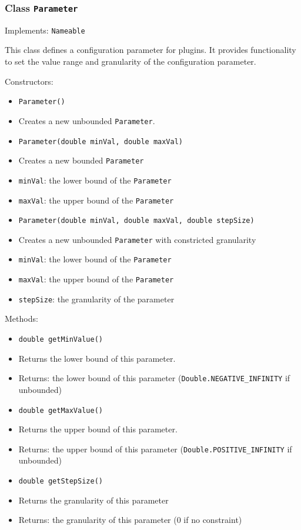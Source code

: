 \documentclass[parskip=full,11pt]{scrartcl}
\begin{document}
\subsubsection{Class \texttt{Parameter}}
Implements: \texttt{Nameable}

This class defines a configuration parameter for plugins. It provides functionality to set the value range and granularity of the configuration parameter.

Constructors:
\begin{itemize}\itemsep -10pt
	\item \texttt{Parameter()}
	\item[] Creates a new unbounded \texttt{Parameter}.

	\item \texttt{Parameter(double minVal, double maxVal)}
	\item[] Creates a new bounded \texttt{Parameter}
	\item[] \texttt{minVal}: the lower bound of the \texttt{Parameter}
	\item[] \texttt{maxVal}: the upper bound of the \texttt{Parameter}
	\item \texttt{Parameter(double minVal, double maxVal, double stepSize)}
	\item[] Creates a new unbounded \texttt{Parameter} with constricted granularity
\item[] \texttt{minVal}: the lower bound of the \texttt{Parameter}
	\item[] \texttt{maxVal}: the upper bound of the \texttt{Parameter}
	\item[] \texttt{stepSize}: the granularity of the parameter

\end{itemize}

Methods:

\begin{itemize}\itemsep -10pt
	\item \texttt{double getMinValue()}
	\item[] Returns the lower bound of this parameter.
	\item[] Returns: the lower bound of this parameter (\texttt{Double.NEGATIVE\_INFINITY} if unbounded)
	\item \texttt{double getMaxValue()}
	\item[] Returns the upper bound of this parameter.
	\item[] Returns: the upper bound of this parameter (\texttt{Double.POSITIVE\_INFINITY} if unbounded)
	\item \texttt{double getStepSize()}
	\item[] Returns the granularity of this parameter
	\item[]Returns: the granularity of this parameter (\(0\) if no constraint)
\end{itemize}
\end{document}
